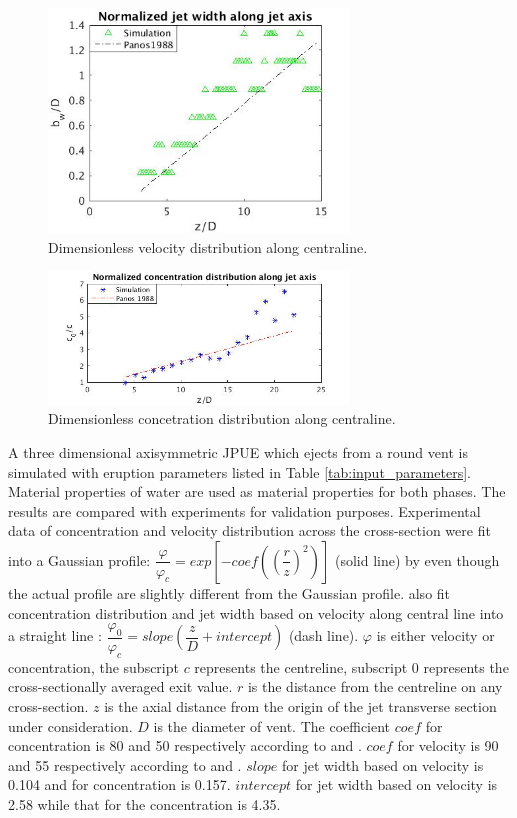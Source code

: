 \documentclass[journal abbreviation, manuscript]{copernicus}
\begin{document}
\begin{figure}
\includegraphics[width=8cm]{velo_along_axis}
\caption{Dimensionless velocity distribution along centraline.}
\label{fig:JPUE_along-axis_vel}
\end{figure}
\begin{figure}
\includegraphics[width=8cm]{conc_along_axis}
\caption{Dimensionless concetration distribution along centraline.}
\label{fig:JPUE_along-axis_conc}
\end{figure}

A three dimensional axisymmetric JPUE which ejects from a round vent is simulated with eruption parameters listed in Table \ref{tab:input_parameters}. Material properties of water are used as material properties for both phases. The results are compared with experiments \citep {george1977turbulence, papanicolaou1988investigations} for validation purposes. Experimental data of concentration and velocity distribution across the cross-section were fit into a Gaussian profile: $\dfrac{\varphi}{\varphi_c}=exp \left[-coef\left( \left(\dfrac{r}{z}\right)^2\right)\right]$ (solid line) by \citet{papanicolaou1988investigations} even though the actual profile are slightly different from the Gaussian profile. \citet{papanicolaou1988investigations} also fit concentration distribution and jet width based on velocity along central line into a straight line : $\dfrac{\varphi_0}{\varphi_c}=slope \left(\dfrac{z}{D} + intercept \right)$ (dash line). $\varphi$ is either velocity or concentration, the subscript $c$ represents the centreline, subscript $0$ represents the cross-sectionally averaged exit value. $r$ is the distance from the centreline on any cross-section. $z$ is the axial distance from the origin of the jet transverse section under consideration. $D$ is the diameter of vent. 
The coefficient $coef$ for concentration is 80 and 50 respectively according to \citet{george1977turbulence} and \citet{papanicolaou1988investigations}. $coef$ for velocity is 90 and 55 respectively according to \citet{george1977turbulence} and \citet{papanicolaou1988investigations}. 
$slope$ for jet width based on velocity is 0.104 and for concentration is 0.157. $intercept$ for jet width based on velocity is 2.58 while that for the concentration is 4.35.
\end{document}
